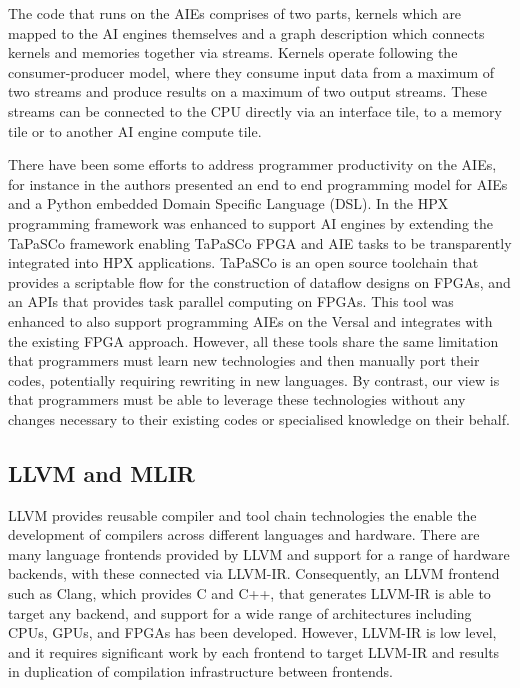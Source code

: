 The code that runs on the AIEs comprises of two parts, kernels which are mapped to the AI engines themselves and a graph description which connects kernels and memories together via streams. Kernels operate following the consumer-producer model, where they consume input data from a maximum of two streams and produce results on a maximum of two output streams. These streams can be connected to the CPU directly via an interface tile, to a memory tile or to another AI engine compute tile.

There have been some efforts to address programmer productivity on the AIEs, for instance in \cite{levental2024end} the authors presented an end to end programming model for AIEs and a Python embedded Domain Specific Language (DSL). In \cite{kalkhof2024enabling} the HPX programming framework was enhanced to support AI engines by extending the TaPaSCo framework enabling TaPaSCo FPGA and AIE tasks to be transparently integrated into HPX applications. TaPaSCo \cite{heinz2021tapasco} is an open source toolchain that provides a scriptable flow for the construction of dataflow designs on FPGAs, and an APIs that provides task parallel computing on FPGAs. This tool was enhanced \cite{heinz2024tapas} to also support programming AIEs on the Versal and integrates with the existing FPGA approach. However, all these tools share the same limitation that programmers must learn new technologies and then manually port their codes, potentially requiring rewriting in new languages. By contrast, our view is that programmers must be able to leverage these technologies without any changes necessary to their existing codes or specialised knowledge on their behalf.

\subsection{LLVM and MLIR}

LLVM \cite{lattner2004llvm} provides reusable compiler and tool chain technologies the enable the development of compilers across different languages and hardware. There are many language frontends provided by LLVM and support for a range of hardware backends, with these connected via LLVM-IR. Consequently, an LLVM frontend such as Clang, which provides C and C++, that generates LLVM-IR is able to target any backend, and support for a wide range of architectures including CPUs, GPUs, and FPGAs has been developed. However, LLVM-IR is low level, and it requires significant work by each frontend to target LLVM-IR and results in duplication of compilation infrastructure between frontends.

